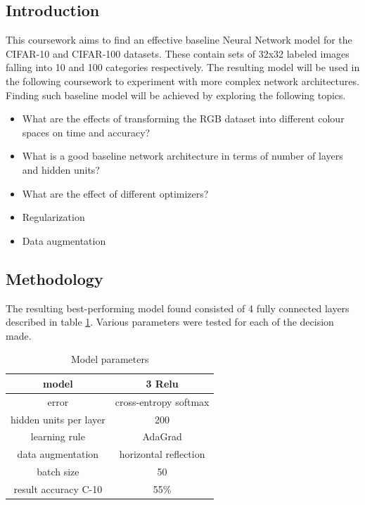 \documentclass[12pt]{article}
\begin{document}
\maketitle


\subsection*{Introduction}
This coursework aims to find an effective baseline Neural Network model for the CIFAR-10 and CIFAR-100 datasets. These contain sets of 32x32 labeled images falling into 10 and 100 categories respectively. The resulting model will be used in the following coursework to experiment with more complex network architectures. Finding such baseline model will be achieved by exploring the following topics.
\begin{itemize}
\item What are the effects of transforming the RGB dataset into different colour spaces on time and accuracy?
\item What is a good baseline network architecture in terms of number of layers and hidden units?
\item  What are the effect of different optimizers?
\item Regularization
\item Data augmentation  
\end{itemize}

\subsection*{Methodology}

The resulting best-performing model found consisted of 4 fully connected layers described in table \ref{tab:model}. Various parameters were tested for each of the decision made. 

\begin{table}[H]
\centering
\begin{tabular}[h]{| c | c |}
\hline
model & 3 Relu  \\
\hline
error & cross-entropy softmax   \\
\hline
hidden units per layer & 200   \\
\hline
learning rule & AdaGrad   \\
\hline 
data augmentation & horizontal reflection  \\
\hline
batch size & 50   \\
\hline
result accuracy C-10& 55\%   \\
\hline
\end{tabular} 
\caption{Model parameters}
\label{tab:model}
\end{table}
\end{document}
